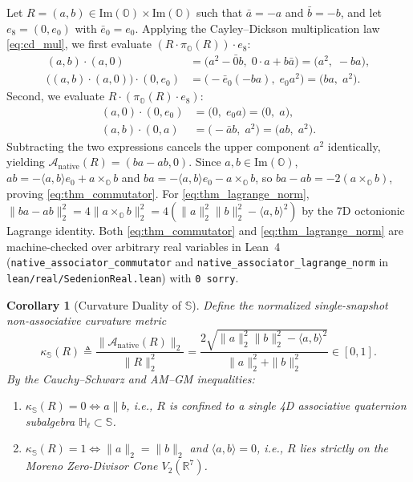 \documentclass[journal,twoside]{IEEEtran}
\newtheorem{corollary}[theorem]{Corollary}
\theoremstyle{definition}
\theoremstyle{remark}
\newcommand{\R}{\mathbb{R}}
\newcommand{\Ha}{\mathbb{H}}
\newcommand{\Oc}{\mathbb{O}}
\newcommand{\Se}{\mathbb{S}}
\newcommand{\ImPart}{\mathrm{Im}}
\newcommand{\Anative}{\mathcal{A}_{\mathrm{native}}}
\newcommand{\kappas}{\kappa_{\Se}}
\begin{document}
\begin{IEEEproof}
Let $R = (a, b) \in \ImPart(\Oc) \times \ImPart(\Oc)$ such that $\bar{a} = -a$ and $\bar{b} = -b$, and let $e_8 = (0, e_0)$ with $\bar{e}_0 = e_0$. Applying the Cayley--Dickson multiplication law \eqref{eq:cd_mul}, we first evaluate $(R \cdot \pi_{\Oc}(R))\cdot e_8$:
\[
\begin{aligned}
    (a, b)\cdot(a, 0) &= \bigl(a^2 - \bar{0}b,\; 0\cdot a + b\bar{a}\bigr) = \bigl(a^2,\; -ba\bigr), \\
    \bigl((a, b)\cdot(a, 0)\bigr)\cdot(0, e_0) &= \bigl(-\bar{e}_0(-ba),\; e_0 a^2\bigr) = \bigl(ba,\; a^2\bigr).
\end{aligned}
\]
Second, we evaluate $R \cdot (\pi_{\Oc}(R)\cdot e_8)$:
\[
\begin{aligned}
    (a, 0)\cdot(0, e_0) &= \bigl(0,\; e_0 a\bigr) = \bigl(0,\; a\bigr), \\
    (a, b)\cdot(0, a) &= \bigl(-\bar{a}b,\; a^2\bigr) = \bigl(ab,\; a^2\bigr).
\end{aligned}
\]
Subtracting the two expressions cancels the upper component $a^2$ identically, yielding $\Anative(R) = (ba - ab, 0)$. Since $a, b \in \ImPart(\Oc)$, $ab = -\langle a, b\rangle e_0 + a\times_{\Oc} b$ and $ba = -\langle a, b\rangle e_0 - a\times_{\Oc} b$, so $ba - ab = -2(a\times_{\Oc} b)$, proving \eqref{eq:thm_commutator}. For \eqref{eq:thm_lagrange_norm}, $\|ba - ab\|_2^2 = 4\|a\times_{\Oc} b\|_2^2 = 4(\|a\|_2^2\|b\|_2^2 - \langle a,b\rangle^2)$ by the 7D octonionic Lagrange identity. Both \eqref{eq:thm_commutator} and \eqref{eq:thm_lagrange_norm} are machine-checked over arbitrary real variables in Lean~4 (\texttt{native\_associator\_commutator} and \texttt{native\_associator\_lagrange\_norm} in \texttt{lean/real/SedenionReal.lean}) with \texttt{0 sorry}.
\end{IEEEproof}

\begin{corollary}[Curvature Duality of $\Se$]
\label{cor:duality}
Define the normalized single-snapshot non-associative curvature metric
\begin{equation}
    \kappas(R) \triangleq \frac{\bigl\|\Anative(R)\bigr\|_2}{\|R\|_2^2} = \frac{2\sqrt{\|a\|_2^2\|b\|_2^2 - \langle a, b\rangle^2}}{\|a\|_2^2 + \|b\|_2^2} \in [0, 1].
    \label{eq:kappas_def}
\end{equation}
By the Cauchy--Schwarz and AM--GM inequalities:
\begin{enumerate}
    \item $\kappas(R) = 0 \iff a \parallel b$, i.e., $R$ is confined to a single 4D associative quaternion subalgebra $\Ha_\ell \subset \Se$.
    \item $\kappas(R) = 1 \iff \|a\|_2 = \|b\|_2$ and $\langle a, b\rangle = 0$, i.e., $R$ lies strictly on the Moreno Zero-Divisor Cone $V_2(\R^7)$.
\end{enumerate}
\end{corollary}
\end{document}
